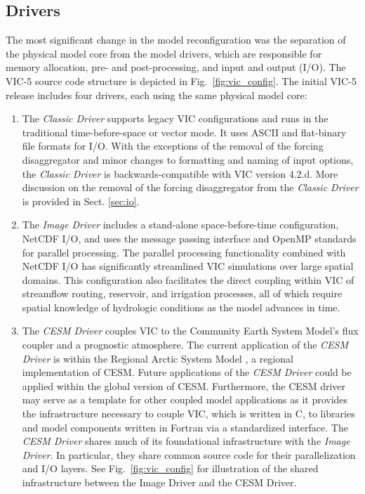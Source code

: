 \documentclass[gmd, manuscript]{copernicus}
\begin{document}
  \subsection{Drivers}
    \label{sec:drivers}
    The most significant change in the model reconfiguration was the separation of the physical model core from the model drivers, which are responsible for memory allocation, pre- and post-processing, and input and output (I/O). The VIC-5 source code structure is depicted in Fig.~\ref{fig:vic_config}. The initial VIC-5 release includes four drivers, each using the same physical model core:

    \begin{enumerate}
      \item  The \textit{Classic Driver} supports legacy VIC configurations and runs in the traditional time-before-space or vector mode. It uses ASCII and flat-binary file formats for I/O.  With the exceptions of the removal of the forcing disaggregator and minor changes to formatting and naming of input options, the \textit{Classic Driver} is backwards-compatible with VIC version 4.2.d. More discussion on the removal of the forcing disaggregator from the \textit{Classic Driver} is provided in Sect. \ref{sec:io}.

      \item The \textit{Image Driver} includes a stand-alone space-before-time configuration, NetCDF I/O, and uses the message passing interface \citep[MPI;][]{Gropp_1996} and OpenMP \citep{Dagum_1998} standards for parallel processing. The parallel processing functionality combined with NetCDF I/O has significantly streamlined VIC simulations over large spatial domains. This configuration also facilitates the direct coupling within VIC of streamflow routing, reservoir, and irrigation processes, all of which require spatial knowledge of hydrologic conditions as the model advances in time.

      \item The \textit{CESM Driver} couples VIC to the Community Earth System Model's \citep[CESM;][]{Hurrell_2013} flux coupler \citep[CPL7;][]{Craig_2012} and a prognostic atmosphere. The current application of the \textit{CESM Driver} is within the Regional Arctic System Model \citep[RASM;][]{Hamman_2016a}, a regional implementation of CESM. Future applications of the \textit{CESM Driver} could be applied within the global version of CESM. Furthermore, the CESM driver may serve as a template for other coupled model applications as it provides the infrastructure necessary to couple VIC, which is written in C, to libraries and model components written in Fortran via a standardized interface. The \textit{CESM Driver} shares much of its foundational infrastructure with the \textit{Image Driver}. In particular, they share common source code for their parallelization and I/O layers. See Fig.~\ref{fig:vic_config} for illustration of the shared infrastructure between the Image Driver and the CESM Driver.


\end{enumerate}
\end{document}
